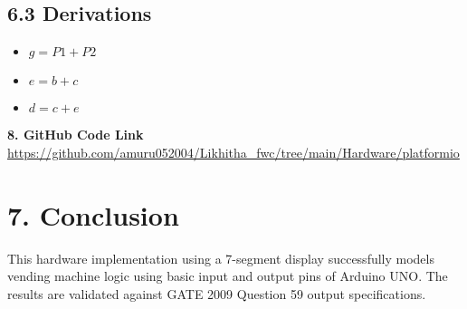 \documentclass[12pt]{article}
\begin{document}
\subsection*{6.3 Derivations}
\begin{itemize}
    \item $g = P1 + P2$
    \item $e = b + c$
    \item $d = c + e$
\end{itemize}


\vspace{1em}
\noindent\textbf{8. GitHub Code Link} \\
\url{https://github.com/amuru052004/Likhitha_fwc/tree/main/Hardware/platformio}

\vspace{1em}
\section*{7. Conclusion}
This hardware implementation using a 7-segment display successfully models vending machine logic using basic input and output pins of Arduino UNO. The results are validated against GATE 2009 Question 59 output specifications.
\end{document}
